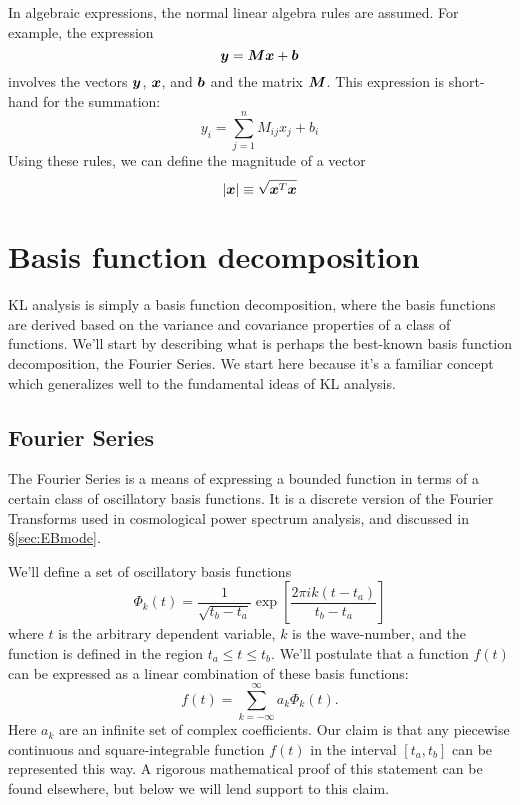 In algebraic expressions, the normal linear algebra rules are assumed.
For example, the expression 
\begin{equation}
  \boldsymbol{y} = \boldsymbol{M}\boldsymbol{x} + \boldsymbol{b}
\end{equation}
involves the vectors $\boldsymbol{y}$, $\boldsymbol{x}$, and $\boldsymbol{b}$ and the
matrix $\boldsymbol{M}$.  This expression is short-hand for the summation:
\begin{equation}
  y_i = \sum_{j=1}^{n} M_{ij} x_j + b_i
\end{equation}
Using these rules, we can define the magnitude of a vector
\begin{equation}
  |\boldsymbol{x}| \equiv \sqrt{\boldsymbol{x}^T \boldsymbol{x}}
\end{equation}

\section{Basis function decomposition}
KL analysis is simply a basis function decomposition, where the basis
functions are derived based on the variance and covariance properties
of a class of functions.  We'll start by describing what is perhaps the
best-known basis function decomposition, the Fourier Series.
We start here because it's a familiar concept which generalizes well to
the fundamental ideas of KL analysis.

\subsection{Fourier Series}
The Fourier Series is a means of expressing a bounded function in terms
of a certain class of oscillatory basis functions.  It is a discrete version
of the Fourier Transforms used in cosmological power spectrum analysis, and
discussed in \S\ref{sec:EBmode}.

We'll define a set of oscillatory basis functions 
\begin{equation}
  \label{eq:fourier_basis}
  \Phi_k(t) = \frac{1}{\sqrt{t_b - t_a}}
  \exp\left[\frac{2\pi i k (t-t_a)}{t_b - t_a}\right]
\end{equation}
where $t$ is the arbitrary dependent variable, $k$ is the wave-number,
and the function is defined in the region $t_a \le t \le t_b$.
We'll postulate that a function $f(t)$ can be expressed as a linear
combination of these basis functions:
\begin{equation}
  \label{eq:fourier_1D}
  f(t) = \sum_{k=-\infty}^\infty a_k\Phi_k(t).
\end{equation}
Here $a_k$ are an infinite set of complex coefficients.  Our claim is that
any piecewise continuous and square-integrable function $f(t)$ in the
interval $[t_a, t_b]$ can be represented this way.
A rigorous mathematical proof
of this statement can be found elsewhere, but below we will lend support
to this claim.

